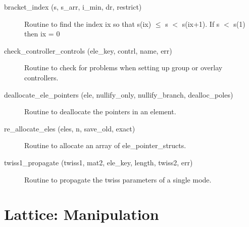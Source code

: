 \begin{description}

\label{r:bracket.index}
\item[bracket_index (s, s_arr, i_min, dr, restrict)] \Newline
Routine to find the index ix so that s(ix) $\le$ s $<$ s(ix+1). 
If s $<$ s(1) then ix = 0 

\label{r:check.controller.controls}
\item[check_controller_controls (ele_key, contrl, name, err)] \Newline 
Routine to check for problems when setting up group or overlay controllers.

\label{r:deallocate.ele.pointers}
\item[deallocate_ele_pointers (ele, nullify_only, nullify_branch, dealloc_poles)] \Newline
Routine to deallocate the pointers in an element. 

\label{r:re.allocate.eles}
\item[re_allocate_eles (eles, n, save_old, exact)] \Newline 
Routine to allocate an array of ele_pointer_structs.

\label{r:twiss1.propagate}
\item[twiss1_propagate (twiss1, mat2, ele_key, length, twiss2, err)] \Newline 
Routine to propagate the twiss parameters of a single mode.

\end{description}

\section{Lattice: Manipulation}
\label{r:manipulation}    

